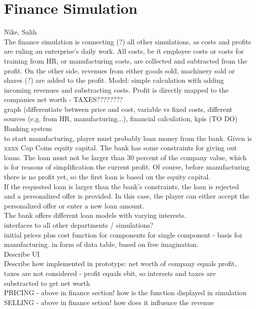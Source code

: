 \documentclass[11pt,titlepage,oneside,openany]{book}
\begin{document}
\section{Finance Simulation}
\label{sec:diag}
Nike, Salih\\
The finance simulation is connecting (?) all other simulations, as costs and profits are ruling an enterprise's daily work. All costs, be it employee costs or costs for training from HR, or manufacturing costs, are collected and subtracted from the profit. On the other side, revenues from either goods sold, machinery sold or shares (?) are added to the profit. Model: simple calculation with adding incoming revenues and substracting costs. Profit is directly mapped to the companies net worth - TAXES????????
\\
graph (differentiate between price and cost, variable vs fixed costs, different sources (e.g. from HR, manufacturing...), financial calculation, kpis (TO DO)\\
Banking system\\
to start manufacturing, player must probably loan money from the bank. Given is xxxx Cap Coins equity capital. The bank has some constraints for giving out loans. The loan must not be larger than 30 percent of the company value, which is for reasons of simplification the current profit. Of course, before manufacturing there is no profit yet, so the first loan is based on the equity capital.\\
If the requested loan is larger than the bank's constraints, the loan is rejected and a personalized offer is provided. In this case, the player can either accept the personalized offer or enter a new loan amount.\\
The bank offers different loan models with varying interests.\\ 
interfaces to all other departments / simulations?\\
initial prices plus cost function for components for single component - basis for manufacturing. in form of data table, based on free imagination.\\
Describe UI \\
Describe how implemented in prototype: net worth of company equals profit, taxes are not considered - profit equals ebit, so interests and taxes are substracted to get net worth\\
PRICING - above in finance section! how is the function displayed in simulation  \\
SELLING - above in finance setion!  how does it influence the revenue\\
\end{document}
